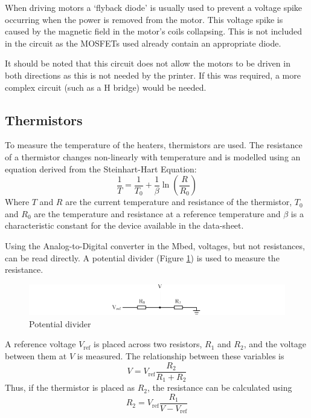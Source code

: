 			When driving motors a `flyback diode' is usually used to prevent a
			voltage spike occurring when the power is removed from the motor. This
			voltage spike is caused by the magnetic field in the motor's coils
			collapsing. This is not included in the circuit as the MOSFETs used
			already contain an appropriate diode.
			
			It should be noted that this circuit does not allow the motors to be
			driven in both directions as this is not needed by the printer. If this
			was required, a more complex circuit (such as a H bridge) would be
			needed.
		
		\subsection{Thermistors}
			
			\label{sec:thermistor}
			
			To measure the temperature of the heaters, thermistors are used. The
			resistance of a thermistor changes non-linearly with temperature and is
			modelled using an equation derived from the Steinhart-Hart
			Equation\cite{Steinhart1968497}:
			\begin{equation}
				\frac{1}{T} = \frac{1}{T_0} + \frac{1}{\beta} \ln \left( \frac{R}{R_0} \right)
				\label{equ:steinhart}
			\end{equation}
			Where $T$ and $R$ are the current temperature and resistance of the
			thermistor, $T_0$ and $R_0$ are the temperature and resistance at a
			reference temperature and $\beta$ is a characteristic constant for the
			device available in the data-sheet.
			
			
			Using the Analog-to-Digital converter in the Mbed, voltages, but not
			resistances, can be read directly. A potential divider (Figure
			\ref{fig:potentialDiv}) is used to measure the resistance.
			\begin{figure}
				\includegraphics[width=1\textwidth]{diagrams/potentialDiv.pdf}
				\caption{Potential divider}
				\label{fig:potentialDiv}
			\end{figure}
			A reference voltage $V_\textrm{ref}$ is placed across two resistors,
			$R_1$ and $R_2$, and the voltage between them at $V$ is measured. The
			relationship between these variables is
			\begin{equation}
				V = V_\textrm{ref} \frac{R_2}{R_1 + R_2}
			\end{equation}
			Thus, if the thermistor is placed as $R_2$, the resistance can be
			calculated using
			\begin{equation}
				R_2 = V_\textrm{ref} \frac{R_1}{V - V_\textrm{ref}}
				\label{equ:potdiv}
			\end{equation}
			
